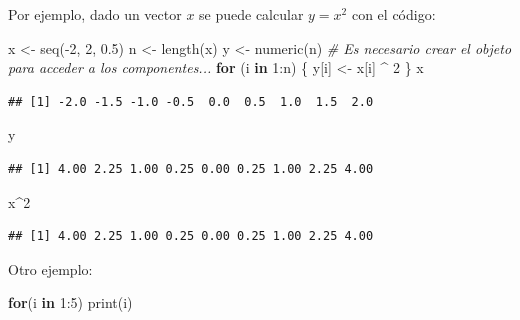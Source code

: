 \documentclass[
]{book}
\newenvironment{Shaded}{\begin{snugshade}}{\end{snugshade}}
\newcommand{\CommentTok}[1]{\textcolor[rgb]{0.56,0.35,0.01}{\textit{#1}}}
\newcommand{\ControlFlowTok}[1]{\textcolor[rgb]{0.13,0.29,0.53}{\textbf{#1}}}
\newcommand{\DecValTok}[1]{\textcolor[rgb]{0.00,0.00,0.81}{#1}}
\newcommand{\FloatTok}[1]{\textcolor[rgb]{0.00,0.00,0.81}{#1}}
\newcommand{\FunctionTok}[1]{\textcolor[rgb]{0.00,0.00,0.00}{#1}}
\newcommand{\NormalTok}[1]{#1}
\newcommand{\OtherTok}[1]{\textcolor[rgb]{0.56,0.35,0.01}{#1}}
\newcommand{\SpecialCharTok}[1]{\textcolor[rgb]{0.00,0.00,0.00}{#1}}
\theoremstyle{break}
\begin{document}
Por ejemplo, dado un vector \(x\) se puede calcular \(y=x^2\) con el código:

\begin{Shaded}
\begin{Highlighting}[]
\NormalTok{x }\OtherTok{\textless{}{-}} \FunctionTok{seq}\NormalTok{(}\SpecialCharTok{{-}}\DecValTok{2}\NormalTok{, }\DecValTok{2}\NormalTok{, }\FloatTok{0.5}\NormalTok{)}
\NormalTok{n }\OtherTok{\textless{}{-}} \FunctionTok{length}\NormalTok{(x)}
\NormalTok{y }\OtherTok{\textless{}{-}} \FunctionTok{numeric}\NormalTok{(n) }\CommentTok{\# Es necesario crear el objeto para acceder a los componentes...}
\ControlFlowTok{for}\NormalTok{ (i }\ControlFlowTok{in} \DecValTok{1}\SpecialCharTok{:}\NormalTok{n) \{ y[i] }\OtherTok{\textless{}{-}}\NormalTok{ x[i] }\SpecialCharTok{\^{}} \DecValTok{2}\NormalTok{ \}}
\NormalTok{x}
\end{Highlighting}
\end{Shaded}

\begin{verbatim}
## [1] -2.0 -1.5 -1.0 -0.5  0.0  0.5  1.0  1.5  2.0
\end{verbatim}

\begin{Shaded}
\begin{Highlighting}[]
\NormalTok{y}
\end{Highlighting}
\end{Shaded}

\begin{verbatim}
## [1] 4.00 2.25 1.00 0.25 0.00 0.25 1.00 2.25 4.00
\end{verbatim}

\begin{Shaded}
\begin{Highlighting}[]
\NormalTok{x}\SpecialCharTok{\^{}}\DecValTok{2}
\end{Highlighting}
\end{Shaded}

\begin{verbatim}
## [1] 4.00 2.25 1.00 0.25 0.00 0.25 1.00 2.25 4.00
\end{verbatim}

Otro ejemplo:

\begin{Shaded}
\begin{Highlighting}[]
\ControlFlowTok{for}\NormalTok{(i }\ControlFlowTok{in} \DecValTok{1}\SpecialCharTok{:}\DecValTok{5}\NormalTok{) }\FunctionTok{print}\NormalTok{(i)}
\end{Highlighting}
\end{Shaded}
\end{document}

